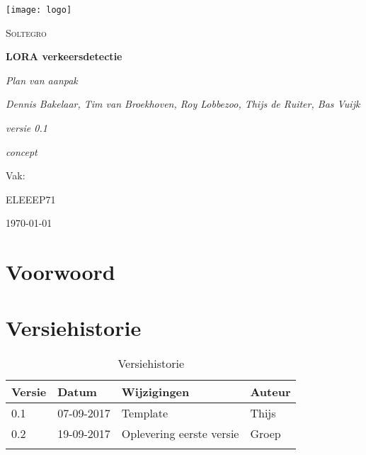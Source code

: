 \documentclass[11pt,a4paper]{article}
\def\auteur{Dennis Bakelaar, Tim van Broekhoven, Roy Lobbezoo, Thijs de Ruiter,  Bas Vuijk}
\def\titel{LORA verkeersdetectie}
\def\datum{\today}
\def\versie{0.1}
\def\status{concept}
\def\subtitel{Plan van aanpak}
\def\bedrijf{Soltegro}
\begin{document}
	
	\begin{titlepage}
		
		\centering
		\texttt{[image: logo]}\par\vspace{1cm}
		{\scshape\LARGE \bedrijf \par}
		\vspace{1cm}
		{\huge\bfseries \titel \par}
		{\huge\itshape \subtitel \par}
		\vspace{1cm}
		{\Large\itshape \auteur \par}
		\vspace{1cm}
		{\Large\itshape versie \versie\par}
		{\Large\itshape \status}		
		
		\vfill
		Vak:\par
		ELEEEP71
		
		\vfill
		{\large \datum \par}
	\end{titlepage}

	\section{Voorwoord}
	
	\clearpage
	
	\tableofcontents
	
	\clearpage
	
	\listoffigures
	
	\clearpage
	\listoftables
	
	\clearpage
	
	\section{Versiehistorie}
	\begin{table}[H]
		\centering
		\label{Versiehistorie}
		\begin{tabular}{|p{1cm}|p{2cm}|p{6cm}|p{2cm}|}
			\hline
			\rowcolor[HTML]{FFCC67}
			\textbf{Versie} & \textbf{Datum} & \textbf{Wijzigingen} & \textbf{Auteur} \\ \hline
			0.1    & 07-09-2017 & Template    & Thijs \\ \hline
			0.2	   & 19-09-2017 & Oplevering eerste versie  & Groep \\ \hline
			&       &             &        \\ \hline
		\end{tabular}
		\caption {Versiehistorie} \label{tab:title} 
	\end{table}	
\end{document}
